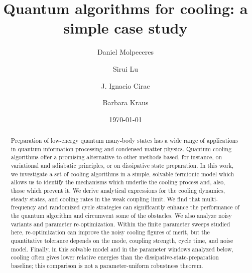\documentclass[aps,prx,twocolumn,superscriptaddress,nofootinbib,nolongbibliography,nobalancelastpage,10pt,floatfix]{revtex4-2}
\begin{document}
\title{Quantum algorithms for cooling: a simple case study}

\author{Daniel Molpeceres}

\author{Sirui Lu}

\author{J. Ignacio Cirac}

\author{Barbara Kraus}


\date{\today}

\begin{abstract}
    Preparation of low-energy quantum many-body states has a wide range of applications in quantum information processing and condensed matter physics. Quantum cooling algorithms offer a promising alternative to other methods based, for instance, on variational and adiabatic principles, or on dissipative state preparation. In this work, we investigate a set of cooling algorithms in a simple, solvable fermionic model which allows us to identify the mechanisms which underlie the cooling process and, also, those which prevent it. We derive analytical expressions for the cooling dynamics, steady states, and cooling rates in the weak coupling limit. We find that multi-frequency and randomized cycle strategies can significantly enhance the performance of the quantum algorithm and circumvent some of the obstacles. We also analyze noisy variants and parameter re-optimization. Within the finite parameter sweeps studied here, re-optimization can improve the noisy cooling figures of merit, but the quantitative tolerance depends on the mode, coupling strength, cycle time, and noise model. Finally, in this solvable model and in the parameter windows analyzed below, cooling often gives lower relative energies than the dissipative-state-preparation baseline; this comparison is not a parameter-uniform robustness theorem.
\end{abstract}
\end{document}

